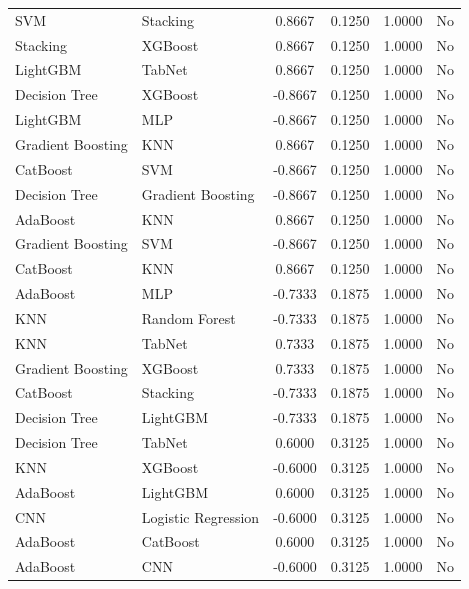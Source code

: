 \documentclass[a4paper,fleqn]{cas-sc}
\begin{document}
{\begin{longtable}{l l c c c c}
SVM                 & Stacking            &  0.8667 & 0.1250 & 1.0000 & No \\
Stacking            & XGBoost             &  0.8667 & 0.1250 & 1.0000 & No \\
LightGBM            & TabNet              &  0.8667 & 0.1250 & 1.0000 & No \\
Decision Tree       & XGBoost             & -0.8667 & 0.1250 & 1.0000 & No \\
LightGBM            & MLP                 & -0.8667 & 0.1250 & 1.0000 & No \\
Gradient Boosting   & KNN                 &  0.8667 & 0.1250 & 1.0000 & No \\
CatBoost            & SVM                 & -0.8667 & 0.1250 & 1.0000 & No \\
Decision Tree       & Gradient Boosting   & -0.8667 & 0.1250 & 1.0000 & No \\
AdaBoost            & KNN                 &  0.8667 & 0.1250 & 1.0000 & No \\
Gradient Boosting   & SVM                 & -0.8667 & 0.1250 & 1.0000 & No \\
CatBoost            & KNN                 &  0.8667 & 0.1250 & 1.0000 & No \\
AdaBoost            & MLP                 & -0.7333 & 0.1875 & 1.0000 & No \\
KNN                 & Random Forest       & -0.7333 & 0.1875 & 1.0000 & No \\
KNN                 & TabNet              &  0.7333 & 0.1875 & 1.0000 & No \\
Gradient Boosting   & XGBoost             &  0.7333 & 0.1875 & 1.0000 & No \\
CatBoost            & Stacking            & -0.7333 & 0.1875 & 1.0000 & No \\
Decision Tree       & LightGBM            & -0.7333 & 0.1875 & 1.0000 & No \\
Decision Tree       & TabNet              &  0.6000 & 0.3125 & 1.0000 & No \\
KNN                 & XGBoost             & -0.6000 & 0.3125 & 1.0000 & No \\
AdaBoost            & LightGBM            &  0.6000 & 0.3125 & 1.0000 & No \\
CNN                 & Logistic Regression & -0.6000 & 0.3125 & 1.0000 & No \\
AdaBoost            & CatBoost            &  0.6000 & 0.3125 & 1.0000 & No \\
AdaBoost            & CNN                 & -0.6000 & 0.3125 & 1.0000 & No \\

\end{longtable}}
\end{document}
